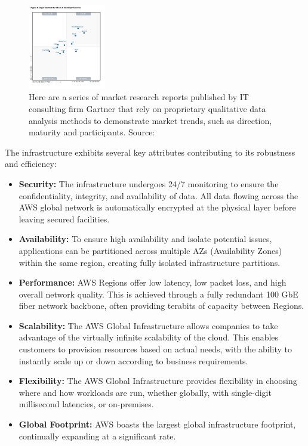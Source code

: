 \begin{figure}[h]  %
  \centering
  \includegraphics[width=0.3\textwidth]{images/AWSMagicQuadrantForCloud.png}  %
  \caption{Here are a series of market research reports published by IT consulting firm Gartner that rely on proprietary qualitative data analysis methods to demonstrate market trends, such as direction, maturity and participants. Source: \cite{GartnerMagicQuadrant}}
  \label{fig:AWSMagicQuadrantForCloud}
\end{figure}

The infrastructure exhibits several key attributes contributing to its robustness and efficiency: 
\begin{itemize} 
  \item \textbf{Security:} The infrastructure undergoes 24/7 monitoring to ensure the confidentiality, integrity, and availability of data. All data flowing across the AWS global network is automatically encrypted at the physical layer before leaving secured facilities.
  \item \textbf{Availability:} To ensure high availability and isolate potential issues, applications can be partitioned across multiple AZs (Availability Zones) within the same region, creating fully isolated infrastructure partitions.
  \item \textbf{Performance:} AWS Regions offer low latency, low packet loss, and high overall network quality. This is achieved through a fully redundant 100 GbE fiber network backbone, often providing terabits of capacity between Regions.
  \item \textbf{Scalability:} The AWS Global Infrastructure allows companies to take advantage of the virtually infinite scalability of the cloud. This enables customers to provision resources based on actual needs, with the ability to instantly scale up or down according to business requirements.
  \item \textbf{Flexibility:} The AWS Global Infrastructure provides flexibility in choosing where and how workloads are run, whether globally, with single-digit millisecond latencies, or on-premises.
  \item \textbf{Global Footprint:} AWS boasts the largest global infrastructure footprint, continually expanding at a significant rate.
\end{itemize}

